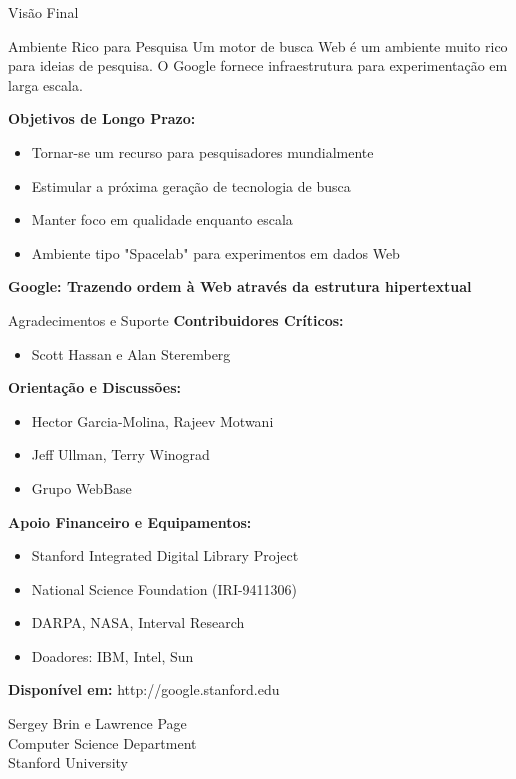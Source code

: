 \documentclass[aspectratio=169]{beamer}
\begin{document}
\begin{frame}{Visão Final}
\begin{block}{Ambiente Rico para Pesquisa}
Um motor de busca Web é um ambiente muito rico para ideias de pesquisa. O Google fornece infraestrutura para experimentação em larga escala.
\end{block}

\vspace{0.3cm}
\textbf{Objetivos de Longo Prazo:}
\begin{itemize}
\item Tornar-se um recurso para pesquisadores mundialmente
\item Estimular a próxima geração de tecnologia de busca
\item Manter foco em qualidade enquanto escala
\item Ambiente tipo "Spacelab" para experimentos em dados Web
\end{itemize}

\vspace{0.5cm}
\begin{center}
\Large{\textbf{Google: Trazendo ordem à Web através da estrutura hipertextual}}
\end{center}
\end{frame}

\begin{frame}{Agradecimentos e Suporte}
\textbf{Contribuidores Críticos:}
\begin{itemize}
\item Scott Hassan e Alan Steremberg
\end{itemize}

\vspace{0.3cm}
\textbf{Orientação e Discussões:}
\begin{itemize}
\item Hector Garcia-Molina, Rajeev Motwani
\item Jeff Ullman, Terry Winograd
\item Grupo WebBase
\end{itemize}

\vspace{0.3cm}
\textbf{Apoio Financeiro e Equipamentos:}
\begin{itemize}
\item Stanford Integrated Digital Library Project
\item National Science Foundation (IRI-9411306)
\item DARPA, NASA, Interval Research
\item Doadores: IBM, Intel, Sun
\end{itemize}
\end{frame}

\begin{frame}


\vspace{1cm}
\normalsize
\textbf{Disponível em:} http://google.stanford.edu

\vspace{0.5cm}
Sergey Brin e Lawrence Page\\
Computer Science Department\\
Stanford University
\end{frame}
\end{document}
